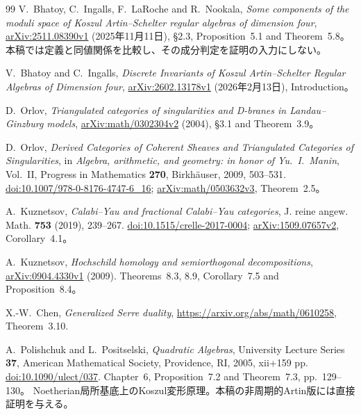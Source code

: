 \documentclass[11pt,a4paper]{ltjsarticle}
\numberwithin{equation}{section}
\begin{document}
\begin{thebibliography}{99}
V.~Bhatoy, C.~Ingalls, F.~LaRoche and R.~Nookala,
\emph{Some components of the moduli space of Koszul Artin--Schelter regular algebras of dimension four},
\href{https://arxiv.org/abs/2511.08390v1}{arXiv:2511.08390v1}
(2025年11月11日), \S2.3, Proposition~5.1 and Theorem~5.8。
本稿では定義と同値関係を比較し、その成分判定を証明の入力にしない。

V.~Bhatoy and C.~Ingalls,
\emph{Discrete Invariants of Koszul Artin--Schelter Regular Algebras of Dimension four},
\href{https://arxiv.org/abs/2602.13178v1}{arXiv:2602.13178v1}
(2026年2月13日), Introduction。

D.~Orlov,
\emph{Triangulated categories of singularities and D-branes in Landau--Ginzburg models},
\href{https://arxiv.org/abs/math/0302304v2}{arXiv:math/0302304v2}
(2004), \S3.1 and Theorem~3.9。

D.~Orlov,
\emph{Derived Categories of Coherent Sheaves and Triangulated Categories of Singularities},
in \emph{Algebra, arithmetic, and geometry: in honor of Yu.~I.~Manin},
Vol.~II, Progress in Mathematics \textbf{270}, Birkh\"auser, 2009, 503--531.
\href{https://doi.org/10.1007/978-0-8176-4747-6_16}{doi:10.1007/978-0-8176-4747-6\_16};
\href{https://arxiv.org/abs/math/0503632v3}{arXiv:math/0503632v3},
Theorem~2.5。

A.~Kuznetsov,
\emph{Calabi--Yau and fractional Calabi--Yau categories},
J. reine angew. Math. \textbf{753} (2019), 239--267.
\href{https://doi.org/10.1515/crelle-2017-0004}{doi:10.1515/crelle-2017-0004};
\href{https://arxiv.org/abs/1509.07657v2}{arXiv:1509.07657v2},
Corollary~4.1。

A.~Kuznetsov,
\emph{Hochschild homology and semiorthogonal decompositions},
\href{https://arxiv.org/abs/0904.4330v1}{arXiv:0904.4330v1} (2009).
Theorems~8.3, 8.9, Corollary~7.5 and Proposition~8.4。

X.-W.~Chen, \emph{Generalized Serre duality},
\url{https://arxiv.org/abs/math/0610258}, Theorem~3.10.

A.~Polishchuk and L.~Positselski,
\emph{Quadratic Algebras}, University Lecture Series \textbf{37},
American Mathematical Society, Providence, RI, 2005, xii+159 pp.
\href{https://doi.org/10.1090/ulect/037}{doi:10.1090/ulect/037}.
Chapter~6, Proposition~7.2 and Theorem~7.3, pp.~129--130。
Noetherian局所基底上のKoszul変形原理。本稿の非周期的Artin版には直接証明を与える。



\end{thebibliography}
\end{document}

